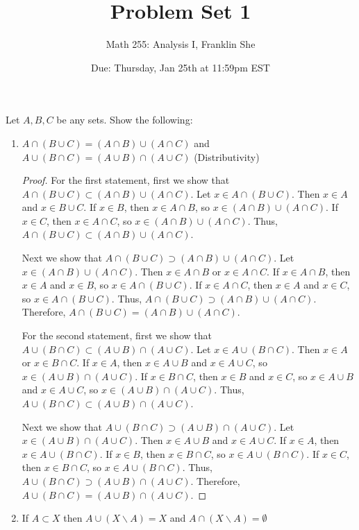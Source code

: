 \documentclass[10pt]{article}
\newenvironment{problem}[2][Problem]{\begin{trivlist}
\item[\hskip \labelsep {\bfseries #1}\hskip \labelsep {\bfseries #2.}]}{\end{trivlist}}
\begin{document}
\title{\vspace{-2cm} Problem Set 1}
\author{Math 255: Analysis I, Franklin She}
\date{Due: Thursday, Jan 25th at 11:59pm EST}

\maketitle
 
\begin{problem}{1}
	Let $ A,B,C $ be any sets. Show the following:
	\begin{enumerate}
		\item $ A \cap (B \cup C) = (A \cap B) \cup (A \cap C) $ and  $ A \cup (B \cap C) = (A \cup B) \cap (A \cup C) $ (Distributivity)
            \begin{proof}
                For the first statement, first we show that $A \cap (B \cup C) \subset (A \cap B) \cup (A \cap C)$. Let $x \in A \cap (B \cup C)$. Then $x \in A$ and $x \in B \cup C$. If $x \in B$, then $x \in A \cap B$, so $x \in (A \cap B) \cup (A \cap C)$. If $x \in C$, then $x \in A \cap C$, so $x \in (A \cap B) \cup (A \cap C)$. Thus, $A \cap (B \cup C) \subset (A \cap B) \cup (A \cap C)$.

                Next we show that $A \cap (B \cup C) \supset (A \cap B) \cup (A \cap C)$. Let $x \in (A \cap B) \cup (A \cap C)$. Then $x \in A \cap B$ or $x \in A \cap C$. If $x \in A \cap B$, then $x \in A$ and $x \in B$, so $x \in A \cap (B \cup C)$. If $x \in A \cap C$, then $x \in A$ and $x \in C$, so $x \in A \cap (B \cup C)$. Thus, $A \cap (B \cup C) \supset (A \cap B) \cup (A \cap C)$. Therefore, $A \cap (B \cup C) = (A \cap B) \cup (A \cap C)$.

                For the second statement, first we show that $A \cup (B \cap C) \subset (A \cup B) \cap (A \cup C)$. Let $x \in A \cup (B \cap C)$. Then $x \in A$ or $x \in B \cap C$. If $x \in A$, then $x \in A \cup B$ and $x \in A \cup C$, so $x \in (A \cup B) \cap (A \cup C)$. If $x \in B \cap C$, then $x \in B$ and $x \in C$, so $x \in A \cup B$ and $x \in A \cup C$, so $x \in (A \cup B) \cap (A \cup C)$. Thus, $A \cup (B \cap C) \subset (A \cup B) \cap (A \cup C)$.

                Next we show that $A \cup (B \cap C) \supset (A \cup B) \cap (A \cup C)$. Let $x \in (A \cup B) \cap (A \cup C)$. Then $x \in A \cup B$ and $x \in A \cup C$. If $x \in A$, then $x \in A \cup (B \cap C)$. If $x \in B$, then $x \in B \cap C$, so $x \in A \cup (B \cap C)$. If $x \in C$, then $x \in B \cap C$, so $x \in A \cup (B \cap C)$. Thus, $A \cup (B \cap C) \supset (A \cup B) \cap (A \cup C)$. Therefore, $A \cup (B \cap C) = (A \cup B) \cap (A \cup C)$.
            \end{proof}
		\item If $ A \subset X $ then $ A \cup (X \smallsetminus A) = X $ and $ A \cap (X \smallsetminus A) = \emptyset $


\end{enumerate}
\end{problem}
\end{document}
